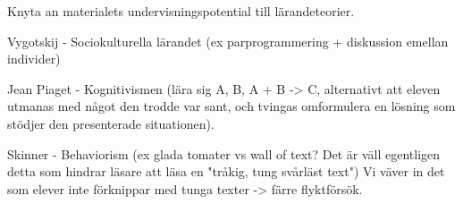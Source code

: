 \begin{binge}
Knyta an materialets undervisningspotential till lärandeteorier.

Vygotskij - Sociokulturella lärandet (ex parprogrammering + diskussion emellan individer)

Jean Piaget - Kognitivismen (lära sig A, B, A + B -> C, alternativt att eleven utmanas med något den trodde var sant, och tvingas omformulera en lösning som stödjer den presenterade situationen).

Skinner - Behaviorism (ex glada tomater vs wall of text? Det är väll egentligen detta som hindrar läsare att läsa en "tråkig, tung svårläst text")
Vi väver in det som elever inte förknippar med tunga texter -> färre flyktförsök.

\end{binge}

